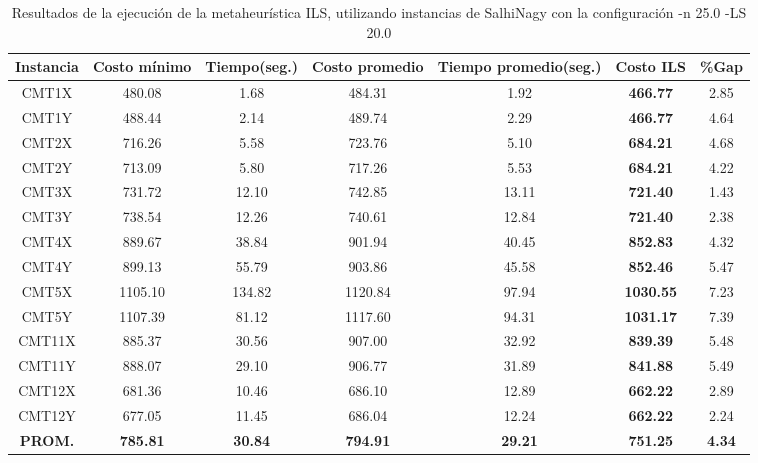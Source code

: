 \begin{table}[ht]
\caption{Resultados de la ejecución de la metaheurística ILS, utilizando instancias de SalhiNagy con la configuración -n 25.0 -LS 20.0}
\centering
\small
\begin{tabular}{c c c c c c c}
\hline\hline
Instancia & Costo mínimo & Tiempo(seg.) & Costo promedio & Tiempo promedio(seg.) & Costo ILS & \%Gap \\ [0.5ex]
\hline
CMT1X & 480.08 & 1.68 & 
484.31 & 1.92 & \bf{466.77} & 
2.85\\CMT1Y & 488.44 & 2.14 & 
489.74 & 2.29 & \bf{466.77} & 
4.64\\CMT2X & 716.26 & 5.58 & 
723.76 & 5.10 & \bf{684.21} & 
4.68\\CMT2Y & 713.09 & 5.80 & 
717.26 & 5.53 & \bf{684.21} & 
4.22\\CMT3X & 731.72 & 12.10 & 
742.85 & 13.11 & \bf{721.40} & 
1.43\\CMT3Y & 738.54 & 12.26 & 
740.61 & 12.84 & \bf{721.40} & 
2.38\\CMT4X & 889.67 & 38.84 & 
901.94 & 40.45 & \bf{852.83} & 
4.32\\CMT4Y & 899.13 & 55.79 & 
903.86 & 45.58 & \bf{852.46} & 
5.47\\CMT5X & 1105.10 & 134.82 & 
1120.84 & 97.94 & \bf{1030.55} & 
7.23\\CMT5Y & 1107.39 & 81.12 & 
1117.60 & 94.31 & \bf{1031.17} & 
7.39\\CMT11X & 885.37 & 30.56 & 
907.00 & 32.92 & \bf{839.39} & 
5.48\\CMT11Y & 888.07 & 29.10 & 
906.77 & 31.89 & \bf{841.88} & 
5.49\\CMT12X & 681.36 & 10.46 & 
686.10 & 12.89 & \bf{662.22} & 
2.89\\CMT12Y & 677.05 & 11.45 & 
686.04 & 12.24 & \bf{662.22} & 
2.24\\\bf{PROM.} & 
\bf{785.81} & \bf{30.84} & \bf{794.91} & \bf{29.21} & \bf{751.25} & \bf{4.34}\\[1ex]\hline
\end{tabular}
\label{table:nonlin}
\end{table} \clearpage
